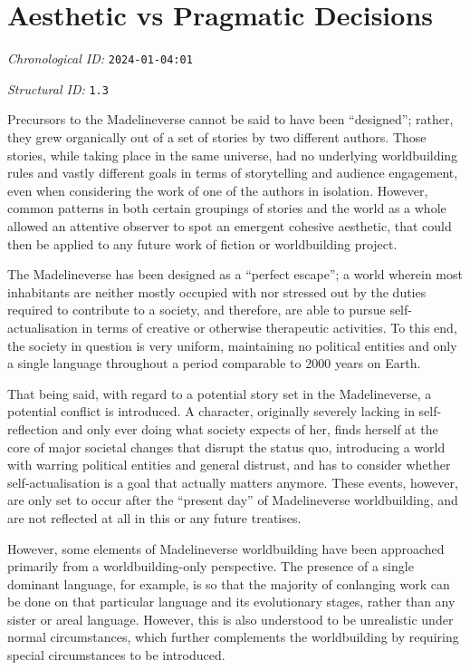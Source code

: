 \section{Aesthetic vs Pragmatic Decisions}
\emph{Chronological ID:} \texttt{2024-01-04:01}

\emph{Structural ID:} \texttt{1.3}

Precursors to the Madelineverse cannot be said to have been ``designed''; rather, they grew organically out of a set of stories by two different authors. Those stories, while taking place in the same universe, had no underlying worldbuilding rules and vastly different goals in terms of storytelling and audience engagement, even when considering the work of one of the authors in isolation. However, common patterns in both certain groupings of stories and the world as a whole allowed an attentive observer to spot an emergent cohesive aesthetic, that could then be applied to any future work of fiction or worldbuilding project.

The Madelineverse has been designed as a ``perfect escape''; a world wherein most inhabitants are neither mostly occupied with nor stressed out by the duties required to contribute to a society, and therefore, are able to pursue self-actualisation in terms of creative or otherwise therapeutic activities. To this end, the society in question is very uniform, maintaining no political entities and only a single language throughout a period comparable to 2000 years on Earth.

That being said, with regard to a potential story set in the Madelineverse, a potential conflict is introduced. A character, originally severely lacking in self-reflection and only ever doing what society expects of her, finds herself at the core of major societal changes that disrupt the status quo, introducing a world with warring political entities and general distrust, and has to consider whether self-actualisation is a goal that actually matters anymore. These events, however, are only set to occur after the ``present day'' of Madelineverse worldbuilding, and are not reflected at all in this or any future treatises.

However, some elements of Madelineverse worldbuilding have been approached primarily from a worldbuilding-only perspective. The presence of a single dominant language, for example, is so that the majority of conlanging work can be done on that particular language and its evolutionary stages, rather than any sister or areal language. However, this is also understood to be unrealistic under normal circumstances, which further complements the worldbuilding by requiring special circumstances to be introduced.
\newpage
